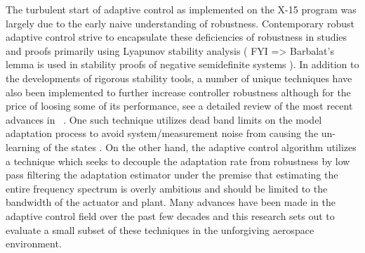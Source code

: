 The turbulent start of adaptive control as implemented on the X-15 program was largely due to the early naive understanding of robustness.  Contemporary robust adaptive control strive to encapsulate these deficiencies of robustness in studies and proofs primarily using Lyapunov stability analysis ( FYI => Barbalat's lemma is used in  stability proofs of negative semidefinite systems ).  In addition to the developments of rigorous stability tools, a number of unique techniques have also been implemented to further increase controller robustness although for the price of loosing some of its performance, see a detailed review of the most recent advances in ~\cite{}.  One such technique utilizes dead band limits on the model adaptation process to avoid system/measurement noise from causing the un-learning of the states \cite{lavretsky2013robust}.  On the other hand, the \Lone adaptive control algorithm utilizes a technique which seeks to decouple the adaptation rate from robustness by low pass filtering the adaptation estimator under the premise that estimating the entire frequency spectrum is overly ambitious and should be limited to the bandwidth of the actuator and plant.  Many advances have been made in the adaptive control field over the past few decades and this research sets out to evaluate a small subset of these techniques in the unforgiving aerospace environment.





